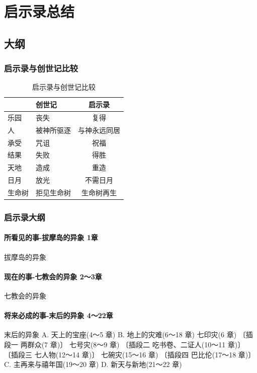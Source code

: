 \chapter{启示录总结}
\section{大纲}
\subsection{启示录与创世记比较}

\begin{table}[H]
\centering
\begin{tabular}{p{7.93em}|p{6.07em}|c} \toprule
 \multicolumn{1}{p{5em}|}{} & \multicolumn{1}{p{4.215em}|}{创世记} & \multicolumn{1}{p{4.215em}}{启示录}  \\ \midrule
乐园&丧失&复得\\\midrule 
人 &被神所驱逐&与神永远同居\\\midrule 
 承受&  咒诅 &祝福    \\ \bottomrule 
结果&失败& 得胜\\\midrule 
天地 &造成 &重造\\\midrule 
日月& 放光& 不需日月\\\midrule 
生命树&拒见生命树& 生命树再生  \\ \bottomrule 
\end{tabular}%
\caption{启示录与创世记比较}
\end{table}%


\subsection{启示录大纲}

\subsubsection{所看见的事-拔摩岛的异象 1章}
拔摩岛的异象
\subsubsection{现在的事-七教会的异象 2～3章}
七教会的异象
\subsubsection{将来必成的事-末后的异象 4～22章}
末后的异象
A. 天上的宝座(4～5 章)
B. 地上的灾难(6～18 章)
七印灾(6 章)
〔插段一 两群众(7 章)〕
七号灾(8～9 章)
〔插段二 吃书卷、二证人(10～11 章)〕
〔插段三 七人物(12～14 章)〕
七碗灾(15～16 章)
〔插段四 巴比伦(17～18 章)〕
C. 主再来与禧年国(19～20 章)
D. 新天与新地(21～22 章)

